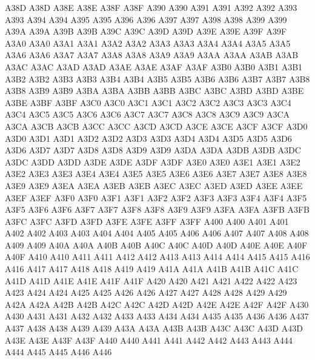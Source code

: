 \ID A38D A38D
\ID A38E A38E
\ID A38F A38F
\ID A390 A390
\ID A391 A391
\ID A392 A392
\ID A393 A393
\ID A394 A394
\ID A395 A395
\ID A396 A396
\ID A397 A397
\ID A398 A398
\ID A399 A399
\ID A39A A39A
\ID A39B A39B
\ID A39C A39C
\ID A39D A39D
\ID A39E A39E
\ID A39F A39F
\ID A3A0 A3A0
\ID A3A1 A3A1
\ID A3A2 A3A2
\ID A3A3 A3A3
\ID A3A4 A3A4
\ID A3A5 A3A5
\ID A3A6 A3A6
\ID A3A7 A3A7
\ID A3A8 A3A8
\ID A3A9 A3A9
\ID A3AA A3AA
\ID A3AB A3AB
\ID A3AC A3AC
\ID A3AD A3AD
\ID A3AE A3AE
\ID A3AF A3AF
\ID A3B0 A3B0
\ID A3B1 A3B1
\ID A3B2 A3B2
\ID A3B3 A3B3
\ID A3B4 A3B4
\ID A3B5 A3B5
\ID A3B6 A3B6
\ID A3B7 A3B7
\ID A3B8 A3B8
\ID A3B9 A3B9
\ID A3BA A3BA
\ID A3BB A3BB
\ID A3BC A3BC
\ID A3BD A3BD
\ID A3BE A3BE
\ID A3BF A3BF
\ID A3C0 A3C0
\ID A3C1 A3C1
\ID A3C2 A3C2
\ID A3C3 A3C3
\ID A3C4 A3C4
\ID A3C5 A3C5
\ID A3C6 A3C6
\ID A3C7 A3C7
\ID A3C8 A3C8
\ID A3C9 A3C9
\ID A3CA A3CA
\ID A3CB A3CB
\ID A3CC A3CC
\ID A3CD A3CD
\ID A3CE A3CE
\ID A3CF A3CF
\ID A3D0 A3D0
\ID A3D1 A3D1
\ID A3D2 A3D2
\ID A3D3 A3D3
\ID A3D4 A3D4
\ID A3D5 A3D5
\ID A3D6 A3D6
\ID A3D7 A3D7
\ID A3D8 A3D8
\ID A3D9 A3D9
\ID A3DA A3DA
\ID A3DB A3DB
\ID A3DC A3DC
\ID A3DD A3DD
\ID A3DE A3DE
\ID A3DF A3DF
\ID A3E0 A3E0
\ID A3E1 A3E1
\ID A3E2 A3E2
\ID A3E3 A3E3
\ID A3E4 A3E4
\ID A3E5 A3E5
\ID A3E6 A3E6
\ID A3E7 A3E7
\ID A3E8 A3E8
\ID A3E9 A3E9
\ID A3EA A3EA
\ID A3EB A3EB
\ID A3EC A3EC
\ID A3ED A3ED
\ID A3EE A3EE
\ID A3EF A3EF
\ID A3F0 A3F0
\ID A3F1 A3F1
\ID A3F2 A3F2
\ID A3F3 A3F3
\ID A3F4 A3F4
\ID A3F5 A3F5
\ID A3F6 A3F6
\ID A3F7 A3F7
\ID A3F8 A3F8
\ID A3F9 A3F9
\ID A3FA A3FA
\ID A3FB A3FB
\ID A3FC A3FC
\ID A3FD A3FD
\ID A3FE A3FE
\ID A3FF A3FF
\ID A400 A400
\ID A401 A401
\ID A402 A402
\ID A403 A403
\ID A404 A404
\ID A405 A405
\ID A406 A406
\ID A407 A407
\ID A408 A408
\ID A409 A409
\ID A40A A40A
\ID A40B A40B
\ID A40C A40C
\ID A40D A40D
\ID A40E A40E
\ID A40F A40F
\ID A410 A410
\ID A411 A411
\ID A412 A412
\ID A413 A413
\ID A414 A414
\ID A415 A415
\ID A416 A416
\ID A417 A417
\ID A418 A418
\ID A419 A419
\ID A41A A41A
\ID A41B A41B
\ID A41C A41C
\ID A41D A41D
\ID A41E A41E
\ID A41F A41F
\ID A420 A420
\ID A421 A421
\ID A422 A422
\ID A423 A423
\ID A424 A424
\ID A425 A425
\ID A426 A426
\ID A427 A427
\ID A428 A428
\ID A429 A429
\ID A42A A42A
\ID A42B A42B
\ID A42C A42C
\ID A42D A42D
\ID A42E A42E
\ID A42F A42F
\ID A430 A430
\ID A431 A431
\ID A432 A432
\ID A433 A433
\ID A434 A434
\ID A435 A435
\ID A436 A436
\ID A437 A437
\ID A438 A438
\ID A439 A439
\ID A43A A43A
\ID A43B A43B
\ID A43C A43C
\ID A43D A43D
\ID A43E A43E
\ID A43F A43F
\ID A440 A440
\ID A441 A441
\ID A442 A442
\ID A443 A443
\ID A444 A444
\ID A445 A445
\ID A446 A446
